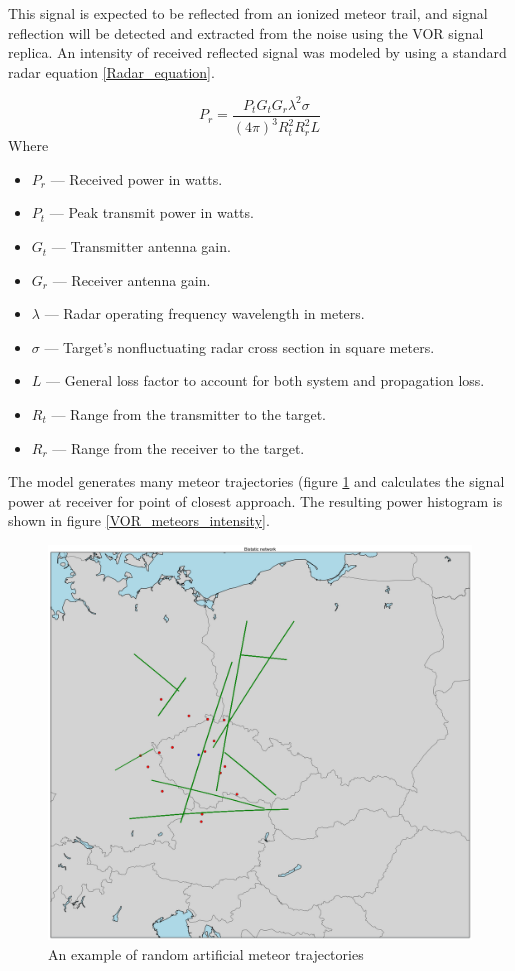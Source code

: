 \documentclass[twoside]{ctuthesis}
\theoremstyle{plain}
\theoremstyle{definition}
\theoremstyle{note}
\begin{document}
This signal is expected to be reflected from an ionized meteor trail, and signal reflection will be detected and extracted from the noise using the VOR signal replica. An intensity of received reflected signal was modeled by using a standard radar equation \ref{Radar_equation}.

\begin{equation}
P_r = \frac{P_t G_t G_r \lambda^2 \sigma}{(4 \pi)^3 R_t ^2 R_r ^2 L}
\label{Radar_equation}
\end{equation}
Where 
\begin{itemize}
\item $P_r$ — Received power in watts.
\item $P_t$ — Peak transmit power in watts.
\item $G_t$ — Transmitter antenna gain.
\item $G_r$ — Receiver antenna gain.
\item $\lambda$ — Radar operating frequency wavelength in meters.
\item $\sigma$ — Target's nonfluctuating radar cross section in square meters.
\item $L$ — General loss factor to account for both system and propagation loss.
\item $R_t$ — Range from the transmitter to the target.
\item $R_r$ — Range from the receiver to the target. 
\end{itemize}

The model generates many meteor trajectories (figure \ref{VOR_meteors} and calculates the signal power at receiver for point of closest approach. The resulting power histogram is shown in figure \ref{VOR_meteors_intensity}.

\begin{figure}
\includegraphics[width=\textwidth]{./img/Modeled_meteor_trajectories.png}
\caption{An example of random artificial meteor trajectories}
\label{VOR_meteors}
\end{figure}
\end{document}

